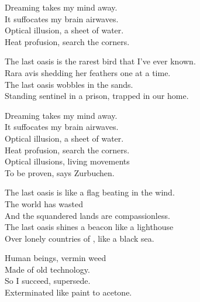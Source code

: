 
Dreaming takes my mind away. \\
It suffocates my brain airwaves. \\

Optical illusion, a sheet of water. \\
Heat profusion, search the corners. \\


The last oasis is the rarest bird that I've ever known. \\
Rara avis shedding her feathers one at a time. \\
The last oasis wobbles in the  sands. \\
Standing sentinel in a prison, trapped in our home. \\


Dreaming takes my mind away. \\
It suffocates my brain airwaves. \\

Optical illusion, a sheet of water. \\
Heat profusion, search the corners. \\

Optical illusions, living movements \\
To be proven, says Zurbuchen. \\


The last oasis is like a flag beating in the wind. \\
The world has wasted \\
And the squandered lands are compassionless. \\
The last oasis shines a beacon like a lighthouse \\
Over lonely countries of , like a black sea. \\





Human beings, vermin weed \\
Made of old technology. \\
So I succeed, supersede. \\
Exterminated like paint to acetone. \\

